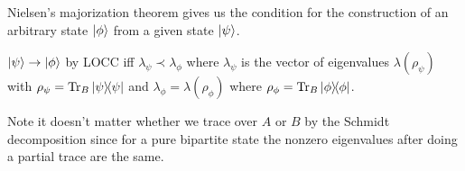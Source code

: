 Nielsen's majorization theorem gives us the condition for the construction of an arbitrary state $\lvert\phi\rangle$ from a given state $\lvert\psi\rangle$.
\begin{thm}
    $\lvert\psi\rangle\to \lvert\phi\rangle$ by LOCC iff $\lambda_\psi \prec \lambda_\phi$ where $\lambda_\psi$ is the vector of eigenvalues $\lambda(\rho_\psi)$ with $\rho_\psi=\operatorname{Tr}_B \left\lvert \psi \middle\rangle\!\middle\langle \psi \right\rvert$ and $\lambda_\phi=\lambda(\rho_\phi)$ where $\rho_\phi=\operatorname{Tr}_B\left\lvert \phi \middle\rangle\!\middle\langle \phi \right\rvert$.
\end{thm}
Note it doesn't matter whether we trace over $A$ or $B$ by the Schmidt decomposition since for a pure bipartite state the nonzero eigenvalues after doing a partial trace are the same.